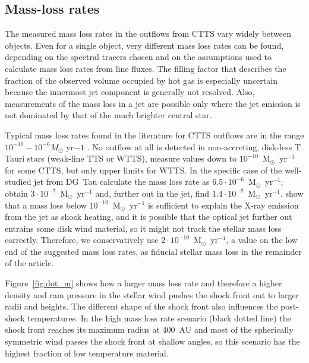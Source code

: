 \subsection{Mass-loss rates}
The measured mass loss rates in the outflows from CTTS vary widely between objects.  Even for a single object, very different mass loss rates can be found, depending on the spectral tracers chosen and on the assumptions used to calculate mass loss rates from line fluxes. The filling factor that describes the fraction of the observed volume occupied by hot gas is especially uncertain because the innermost jet component is generally not resolved. Also, measurements of the mass loss in a jet are possible only where the jet emission is not dominated by that of the much brighter central star. 

Typical mass loss rates found in the literature for CTTS outflows are in the range $10^{-10}-10^{-6}M_{\odot}\textrm{ yr}{-1}$ \citep{1999A&A...342..717B,2006A&A...456..189P}. No outflow at all is detected in non-accreting, disk-less T Tauri stars (weak-line TTS or WTTS), \citet{2006ApJ...646..319E} measure values down to $10^{-10}$~M$_{\odot}$~yr$^{-1}$ for some CTTS, but only upper limits for WTTS. In the specific case of the well-studied jet from DG~Tau \citet{1997A&A...327..671L} calculate the  mass loss rate as $6.5\cdot 10^{-6}$~M$_{\odot}$~yr$^{-1}$; \citet{1995ApJ...452..736H}
obtain $3\cdot 10^{-7}$~M$_{\odot}$~yr$^{-1}$ and, further out in the jet, \citet{2000A&A...356L..41L} find $1.4\cdot 10^{-8}$~M$_{\odot}$~yr$^{-1}$. 
\citet{2009A&A...493..579G} show that a mass loss below $10^{-10}$~M$_{\odot}$~yr$^{-1}$ is sufficient to explain the X-ray emission from the jet as shock heating, and it is possible that the optical jet further out entrains some disk wind material, so it might not track the stellar mass loss correctly.
Therefore, we conservatively use $2\cdot 10^{-10}$~M$_{\odot}$~yr$^{-1}$, a value on the low end of the suggested mass loss rates, as fiducial stellar mass loss in the remainder of the article.

Figure~\ref{fig:dot_m} shows how a larger mass loss rate and therefore a higher density and ram pressure in the stellar wind pushes the shock front out to larger radii and heights. The different shape of the shock front also influences the post-shock temperatures. In the high mass loss rate scenario (black dotted line) the shock front reaches its maximum radius at 400~AU and most of the spherically symmetric wind passes the shock front at shallow angles, so this scenario has the highest fraction of low temperature material.
